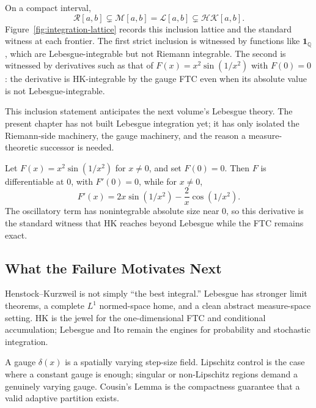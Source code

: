 \begin{remark*}[Interpretation]
On a compact interval,
\[
  \mathcal R[a,b]\subsetneq \mathcal M[a,b]=\mathcal L[a,b]
  \subsetneq \mathcal{HK}[a,b].
\]
Figure~\ref{fig:integration-lattice} records this inclusion lattice and the
standard witness at each frontier.
The first strict inclusion is witnessed by functions like
\(\mathbf 1_{\mathbb Q}\), which are Lebesgue-integrable but not Riemann
integrable. The second is witnessed by derivatives such as that of
\(F(x)=x^2\sin(1/x
^2)\) with \(F(0)=0\): the derivative is HK-integrable by the
gauge FTC even when its absolute value is not Lebesgue-integrable.

This inclusion statement anticipates the next volume's Lebesgue theory. The
present chapter has not built Lebesgue integration yet; it has only isolated
the Riemann-side machinery, the gauge machinery, and the reason a
measure-theoretic successor is needed.
\end{remark*}



\begin{remark*}[Interpretation]
Let \(F(x)=x^2\sin(1/x^2)\) for \(x\ne0\), and set \(F(0)=0\). Then \(F\) is
differentiable at \(0\), with \(F'(0)=0\), while for \(x\ne0\),
\[
  F'(x)=2x\sin(1/x^2)-\frac{2}{x}\cos(1/x^2).
\]
The oscillatory term has nonintegrable absolute size near \(0\), so this
derivative is the standard witness that HK reaches beyond Lebesgue while the
FTC remains exact.
\end{remark*}

\subsection*{What the Failure Motivates Next}

\begin{remark*}[Interpretation]
Henstock--Kurzweil is not simply ``the best integral.'' Lebesgue has stronger
limit theorems, a complete \(L^1\) normed-space home, and a clean abstract
measure-space setting. HK is the jewel for the one-dimensional FTC and
conditional accumulation; Lebesgue and Ito remain the engines for probability
and stochastic integration.
\end{remark*}

\begin{remark*}[Interpretation]
A gauge \(\delta(x)\) is a spatially varying step-size field. Lipschitz
control is the case where a constant gauge is enough; singular or non-Lipschitz
regions demand a genuinely varying gauge. Cousin's Lemma is the compactness
guarantee that a valid adaptive partition exists.
\end{remark*}

